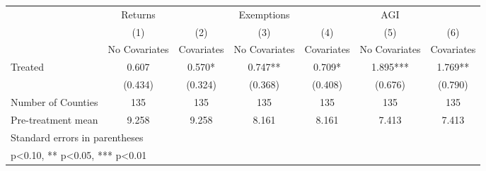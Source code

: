 {
\def\sym#1{\ifmmode^{#1}\else\(^{#1}\)\fi}
\begin{tabular}{l*{6}{c}}
\hline\hline
            &     Returns   &               &  Exemptions   &               &         AGI   &               \\
            &\multicolumn{1}{c}{(1)}&\multicolumn{1}{c}{(2)}&\multicolumn{1}{c}{(3)}&\multicolumn{1}{c}{(4)}&\multicolumn{1}{c}{(5)}&\multicolumn{1}{c}{(6)}\\
            &\multicolumn{1}{c}{No Covariates}&\multicolumn{1}{c}{Covariates}&\multicolumn{1}{c}{No Covariates}&\multicolumn{1}{c}{Covariates}&\multicolumn{1}{c}{No Covariates}&\multicolumn{1}{c}{Covariates}\\
\hline
Treated     &       0.607   &       0.570*  &       0.747** &       0.709*  &       1.895***&       1.769** \\
            &     (0.434)   &     (0.324)   &     (0.368)   &     (0.408)   &     (0.676)   &     (0.790)   \\
\hline
Number of Counties&         135   &         135   &         135   &         135   &         135   &         135   \\
Pre-treatment mean&       9.258   &       9.258   &       8.161   &       8.161   &       7.413   &       7.413   \\
\hline\hline
\multicolumn{7}{l}{\footnotesize Standard errors in parentheses}\\
\multicolumn{7}{l}{\footnotesize * p<0.10, ** p<0.05, *** p<0.01}\\
\end{tabular}
}
